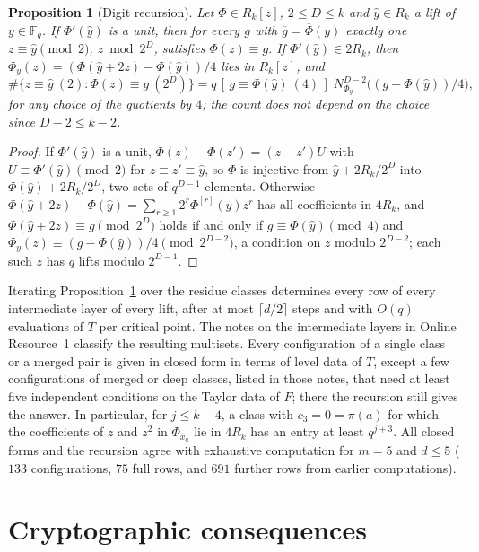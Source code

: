 \documentclass[11pt]{article}
\newtheorem{proposition}[theorem]{Proposition}
\theoremstyle{definition}
\theoremstyle{remark}
\newcommand{\F}{\mathbb{F}}
\newcommand{\ol}[1]{\overline{#1}}
\begin{document}
\begin{proposition}[Digit recursion]\label{prop:GR}
Let $\Phi\in R_k[z]$, $2\le D\le k$ and $\hat y\in R_k$ a lift of $y\in\F_q$. If $\Phi'(\hat y)$ is a unit, then for every
$g$ with $\ol g=\ol\Phi(y)$ exactly one $z\equiv\hat y\pmod2$, $z\bmod 2^D$, satisfies $\Phi(z)\equiv g$. If
$\Phi'(\hat y)\in2R_k$, then $\Phi_y(z)=(\Phi(\hat y+2z)-\Phi(\hat y))/4$ lies in $R_k[z]$, and
\[
\#\{z\equiv\hat y\ (2):\Phi(z)\equiv g\ (2^D)\}=q\,[\,g\equiv\Phi(\hat y)\ (4)\,]\;N^{D-2}_{\Phi_y}\bigl((g-\Phi(\hat y))/4\bigr),
\]
for any choice of the quotients by $4$; the count does not depend on the choice since $D-2\le k-2$.
\end{proposition}
\begin{proof}
If $\Phi'(\hat y)$ is a unit, $\Phi(z)-\Phi(z')=(z-z')U$ with $U\equiv\Phi'(\hat y)\pmod2$ for $z\equiv z'\equiv\hat y$, so
$\Phi$ is injective from $\hat y+2R_k/2^D$ into $\Phi(\hat y)+2R_k/2^D$, two sets of $q^{D-1}$ elements. Otherwise
$\Phi(\hat y+2z)-\Phi(\hat y)=\sum_{r\ge1}2^r\Phi^{[r]}(\hat y)z^r$ has all coefficients in $4R_k$, and
$\Phi(\hat y+2z)\equiv g\pmod{2^D}$ holds if and only if $g\equiv\Phi(\hat y)\pmod4$ and $\Phi_y(z)\equiv(g-\Phi(\hat y))/4
\pmod{2^{D-2}}$, a condition on $z$ modulo $2^{D-2}$; each such $z$ has $q$ lifts modulo $2^{D-1}$.
\end{proof}

Iterating Proposition~\ref{prop:GR} over the residue classes determines every row of every intermediate layer of every
lift, after at most $\lceil d/2\rceil$ steps and with $O(q)$ evaluations of $T$ per critical point. The notes on the
intermediate layers in Online Resource~1 classify the resulting multisets. Every configuration of a single class or a merged
pair is given in closed form in terms of level data of $T$, except a few configurations of merged or deep classes, listed in those
notes, that need at least five independent conditions on the Taylor data of $F$; there the recursion
still gives the answer. In particular, for $j\le k-4$, a class with $c_3=0=\pi(a)$ for which the coefficients of $z$
and $z^2$ in $\Phi_{x_a}$ lie in $4R_k$ has an entry at least $q^{j+3}$.
All closed forms and the recursion agree with exhaustive computation for $m=5$ and $d\le5$ ($133$ configurations, $75$
full rows, and $691$ further rows from earlier computations).

\section{Cryptographic consequences}\label{sec:crypto}
\end{document}
